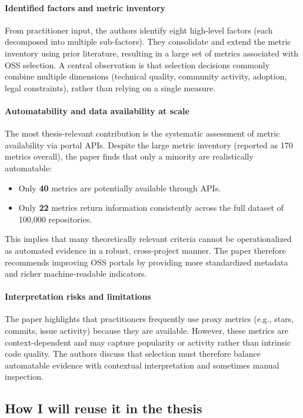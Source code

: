 \documentclass[11pt,a4paper]{article}
\begin{document}
\paragraph{Identified factors and metric inventory}
From practitioner input, the authors identify eight high-level factors (each decomposed into multiple sub-factors). They consolidate and extend the metric inventory using prior literature, resulting in a large set of metrics associated with OSS selection. A central observation is that selection decisions commonly combine multiple dimensions (technical quality, community activity, adoption, legal constraints), rather than relying on a single measure.

\paragraph{Automatability and data availability at scale}
The most thesis-relevant contribution is the systematic assessment of metric availability via portal APIs. Despite the large metric inventory (reported as 170 metrics overall), the paper finds that only a minority are realistically automatable:
\begin{itemize}[leftmargin=*]
  \item Only \textbf{40} metrics are potentially available through APIs.
  \item Only \textbf{22} metrics return information consistently across the full dataset of 100{,}000 repositories.
\end{itemize}
This implies that many theoretically relevant criteria cannot be operationalized as automated evidence in a robust, cross-project manner. The paper therefore recommends improving OSS portals by providing more standardized metadata and richer machine-readable indicators.

\paragraph{Interpretation risks and limitations}
The paper highlights that practitioners frequently use proxy metrics (e.g., stars, commits, issue activity) because they are available. However, these metrics are context-dependent and may capture popularity or activity rather than intrinsic code quality. The authors discuss that selection must therefore balance automatable evidence with contextual interpretation and sometimes manual inspection.

\subsection{How I will reuse it in the thesis}
\end{document}
